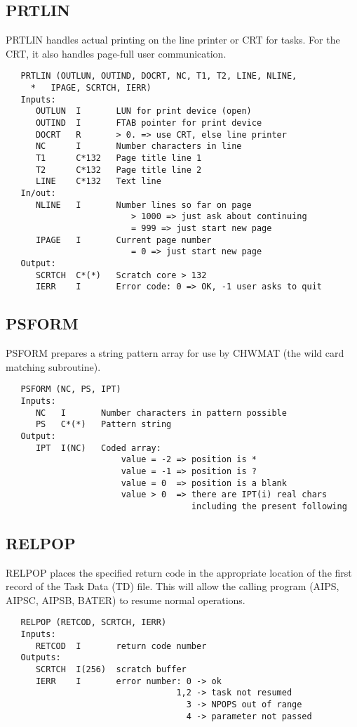 \subsection{PRTLIN}
PRTLIN handles actual printing on the line printer or CRT for tasks.
For the CRT, it also handles page-full user communication.
\begin{verbatim}
   PRTLIN (OUTLUN, OUTIND, DOCRT, NC, T1, T2, LINE, NLINE,
     *   IPAGE, SCRTCH, IERR)
   Inputs:
      OUTLUN  I       LUN for print device (open)
      OUTIND  I       FTAB pointer for print device
      DOCRT   R       > 0. => use CRT, else line printer
      NC      I       Number characters in line
      T1      C*132   Page title line 1
      T2      C*132   Page title line 2
      LINE    C*132   Text line
   In/out:
      NLINE   I       Number lines so far on page
                         > 1000 => just ask about continuing
                         = 999 => just start new page
      IPAGE   I       Current page number
                         = 0 => just start new page
   Output:
      SCRTCH  C*(*)   Scratch core > 132
      IERR    I       Error code: 0 => OK, -1 user asks to quit
\end{verbatim}

\subsection{PSFORM}
PSFORM prepares a string pattern array for use by CHWMAT (the wild
card matching subroutine).
\begin{verbatim}
   PSFORM (NC, PS, IPT)
   Inputs:
      NC   I       Number characters in pattern possible
      PS   C*(*)   Pattern string
   Output:
      IPT  I(NC)   Coded array:
                       value = -2 => position is *
                       value = -1 => position is ?
                       value = 0  => position is a blank
                       value > 0  => there are IPT(i) real chars
                                     including the present following
\end{verbatim}

\subsection{RELPOP}
RELPOP places the specified return code in the appropriate location
of the first record of the Task Data (TD) file.  This will allow the
calling program (AIPS, AIPSC, AIPSB, BATER) to resume normal
operations.
\begin{verbatim}
   RELPOP (RETCOD, SCRTCH, IERR)
   Inputs:
      RETCOD  I       return code number
   Outputs:
      SCRTCH  I(256)  scratch buffer
      IERR    I       error number: 0 -> ok
                                  1,2 -> task not resumed
                                    3 -> NPOPS out of range
                                    4 -> parameter not passed
\end{verbatim}

